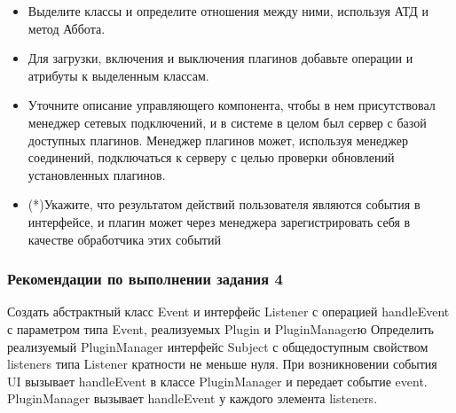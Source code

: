 \documentclass{article}
\begin{document}
\begin{itemize}
    \item Выделите классы и определите отношения между ними, используя АТД и метод Аббота.
    \item Для загрузки, включения и выключения плагинов добавьте операции и атрибуты к выделенным классам.
    \item Уточните описание управляющего компонента, чтобы в нем присутствовал менеджер сетевых подключений, и в системе в целом был сервер с базой доступных плагинов. Менеджер плагинов может, используя менеджер соединений, подключаться к серверу с целью проверки обновлений установленных плагинов.
    \item (*)Укажите, что результатом действий пользователя являются события в интерфейсе, и плагин может через менеджера зарегистрировать себя в качестве обработчика этих событий
\end{itemize}

\subsubsection{Рекомендации по выполнении задания 4}
Создать абстрактный класс Event и интерфейс Listener с операцией handleEvent с параметром типа Event, реализуемых Plugin и PluginManagerю Определить реализуемый PluginManager интерфейс Subject с общедоступным свойством listeners типа Listener кратности не меньше нуля. При возникновении события UI вызывает handleEvent в классе PluginManager и передает событие event. PluginManager вызывает handleEvent у каждого элемента listeners.
\end{document}
